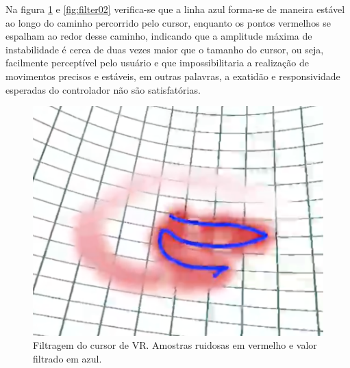\documentclass{vgtc}                          %
\begin{document}
Na figura \ref{fig:filter01} e \ref{fig:filter02} verifica-se que a linha azul forma-se de maneira estável ao longo do caminho percorrido pelo cursor, enquanto os pontos vermelhos se espalham ao redor desse caminho, indicando que a amplitude máxima de instabilidade é cerca de duas vezes maior que o tamanho do cursor, ou seja, facilmente perceptível pelo usuário e que impossibilitaria a realização de movimentos precisos e estáveis, em outras palavras, a exatidão e responsividade esperadas do controlador não são satisfatórias.

\begin{figure}[h!]
\centering
\includegraphics[width=\linewidth]{image_01.png}
\caption{Filtragem do cursor de VR. Amostras ruidosas em vermelho e valor filtrado em azul.}
\label{fig:filter01}
\end{figure}
\end{document}

